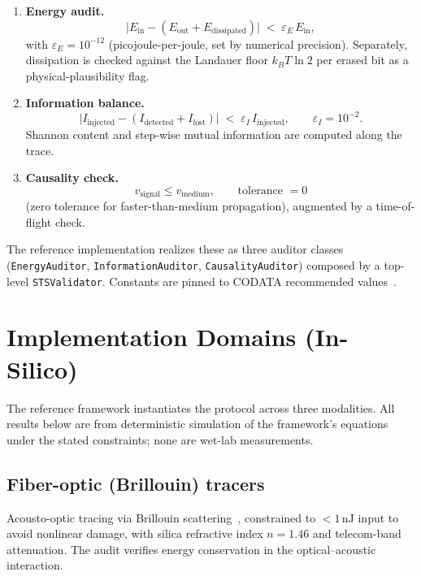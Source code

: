 \documentclass[11pt,a4paper]{article}
\begin{document}
\begin{enumerate}[leftmargin=1.6em]
  \item \textbf{Energy audit.}
  \begin{equation}
  \bigl| E_\mathrm{in} - (E_\mathrm{out} + E_\mathrm{dissipated}) \bigr|
  \;<\; \varepsilon_E\, E_\mathrm{in},
  \end{equation}
  with $\varepsilon_E = 10^{-12}$ (picojoule-per-joule, set by numerical
  precision). Separately, dissipation is checked against the Landauer floor
  $k_B T \ln 2$ per erased bit as a physical-plausibility flag.

  \item \textbf{Information balance.}
  \begin{equation}
  \bigl| I_\mathrm{injected} - (I_\mathrm{detected} + I_\mathrm{lost}) \bigr|
  \;<\; \varepsilon_I\, I_\mathrm{injected},
  \qquad \varepsilon_I = 10^{-2}.
  \end{equation}
  Shannon content and step-wise mutual information are computed along the trace.

  \item \textbf{Causality check.}
  \begin{equation}
  v_\mathrm{signal} \le v_\mathrm{medium}, \qquad \text{tolerance } = 0
  \end{equation}
  (zero tolerance for faster-than-medium propagation), augmented by a
  time-of-flight check.
\end{enumerate}

The reference implementation realizes these as three auditor classes
(\texttt{EnergyAuditor}, \texttt{InformationAuditor}, \texttt{CausalityAuditor})
composed by a top-level \texttt{STSValidator}. Constants are pinned to CODATA
recommended values~\citep{codata2018}.

\section{Implementation Domains (In-Silico)}
\label{sec:domains}

The reference framework instantiates the protocol across three modalities. All
results below are from deterministic simulation of the framework's equations under
the stated constraints; none are wet-lab measurements.

\subsection{Fiber-optic (Brillouin) tracers}
Acousto-optic tracing via Brillouin
scattering~\citep{brillouin1922scattering}, constrained to
$<1\,\mathrm{nJ}$ input to avoid nonlinear damage, with silica refractive index
$n=1.46$ and telecom-band attenuation. The audit verifies energy conservation in
the optical--acoustic interaction.
\end{document}
